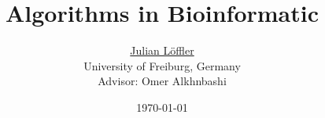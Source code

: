 \documentclass[12pt,a4paper,english,intoc,bibliography=totoc,index=totoc,BCOR10mm,captions=tableheading,fleqn,oneside]{scrartcl}
\begin{document}
\title{Algorithms in Bioinformatic}
\author{\href{mailto:loefflju@informatik.uni-freiburg.de}{Julian L\"offler}\\ {\small University of Freiburg, Germany}\\[1cm]{\small Advisor: Omer Alkhnbashi}}
\date{\small\today}

\maketitle
\thispagestyle{empty}
\clearpage
{}
\hypersetup{pageanchor=false}
\tableofcontents
\hypersetup{pageanchor=true}  %

\clearpage
{}




\pagebreak


\end{document}

